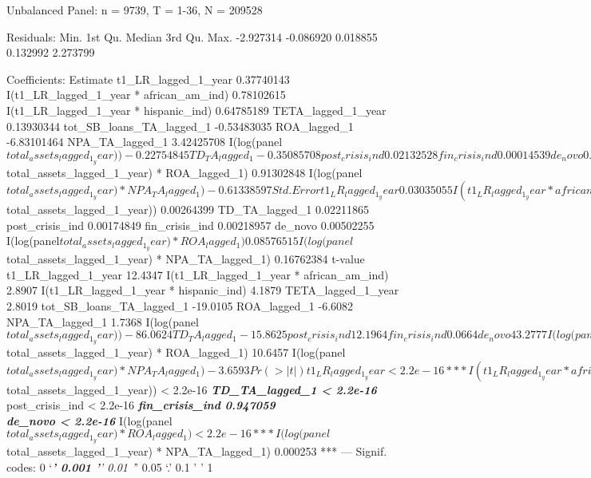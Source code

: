 \documentclass[]{article}
\begin{document}
Unbalanced Panel: n = 9739, T = 1-36, N = 209528

Residuals: Min. 1st Qu. Median 3rd Qu. Max. -2.927314 -0.086920 0.018855
0.132992 2.273799

Coefficients: Estimate t1\_LR\_lagged\_1\_year 0.37740143
I(t1\_LR\_lagged\_1\_year * african\_am\_ind) 0.78102615
I(t1\_LR\_lagged\_1\_year * hispanic\_ind) 0.64785189
TETA\_lagged\_1\_year 0.13930344 tot\_SB\_loans\_TA\_lagged\_1
-0.53483035 ROA\_lagged\_1 -6.83101464 NPA\_TA\_lagged\_1 3.42425708
I(log(panel\(total_assets_lagged_1_year)) -0.22754845 TD_TA_lagged_1 -0.35085708 post_crisis_ind 0.02132528 fin_crisis_ind 0.00014539 de_novo 0.21736440 I(log(panel\)total\_assets\_lagged\_1\_year)
* ROA\_lagged\_1) 0.91302848
I(log(panel\(total_assets_lagged_1_year) * NPA_TA_lagged_1) -0.61338597  Std. Error t1_LR_lagged_1_year 0.03035055 I(t1_LR_lagged_1_year * african_am_ind) 0.27018520 I(t1_LR_lagged_1_year * hispanic_ind) 0.15469579 TETA_lagged_1_year 0.04971667 tot_SB_loans_TA_lagged_1 0.02813338 ROA_lagged_1 1.03371146 NPA_TA_lagged_1 1.97163612 I(log(panel\)total\_assets\_lagged\_1\_year))
0.00264399 TD\_TA\_lagged\_1 0.02211865 post\_crisis\_ind 0.00174849
fin\_crisis\_ind 0.00218957 de\_novo 0.00502255
I(log(panel\(total_assets_lagged_1_year) * ROA_lagged_1) 0.08576515 I(log(panel\)total\_assets\_lagged\_1\_year)
* NPA\_TA\_lagged\_1) 0.16762384 t-value t1\_LR\_lagged\_1\_year 12.4347
I(t1\_LR\_lagged\_1\_year * african\_am\_ind) 2.8907
I(t1\_LR\_lagged\_1\_year * hispanic\_ind) 4.1879 TETA\_lagged\_1\_year
2.8019 tot\_SB\_loans\_TA\_lagged\_1 -19.0105 ROA\_lagged\_1 -6.6082
NPA\_TA\_lagged\_1 1.7368
I(log(panel\(total_assets_lagged_1_year)) -86.0624 TD_TA_lagged_1 -15.8625 post_crisis_ind 12.1964 fin_crisis_ind 0.0664 de_novo 43.2777 I(log(panel\)total\_assets\_lagged\_1\_year)
* ROA\_lagged\_1) 10.6457
I(log(panel\(total_assets_lagged_1_year) * NPA_TA_lagged_1) -3.6593  Pr(>|t|) t1_LR_lagged_1_year < 2.2e-16 *** I(t1_LR_lagged_1_year * african_am_ind) 0.003844 ** I(t1_LR_lagged_1_year * hispanic_ind) 2.817e-05 *** TETA_lagged_1_year 0.005080 ** tot_SB_loans_TA_lagged_1 < 2.2e-16 *** ROA_lagged_1 3.899e-11 *** NPA_TA_lagged_1 0.082431 . I(log(panel\)total\_assets\_lagged\_1\_year))
\textless{} 2.2e-16 \textbf{\emph{ TD\_TA\_lagged\_1 \textless{} 2.2e-16
}} post\_crisis\_ind \textless{} 2.2e-16 \textbf{\emph{ fin\_crisis\_ind
0.947059\\
de\_novo \textless{} 2.2e-16 }}
I(log(panel\(total_assets_lagged_1_year) * ROA_lagged_1) < 2.2e-16 *** I(log(panel\)total\_assets\_lagged\_1\_year)
* NPA\_TA\_lagged\_1) 0.000253 *** --- Signif. codes: 0 `\emph{\textbf{'
0.001 '}' 0.01 '}' 0.05 `.' 0.1 ' ' 1
\end{document}
